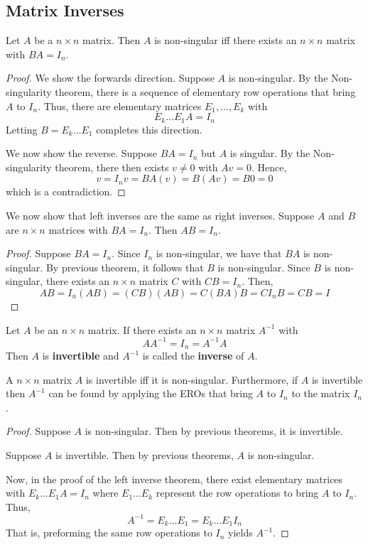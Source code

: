 \documentclass{article}
\begin{document}
\subsection{Matrix Inverses}
\begin{theorem}
  Let $A$ be a $n\times n$ matrix. Then $A$ is non-singular iff there exists an $n \times n$ matrix with $BA = I_n$.
\end{theorem}
\begin{proof}
  We show the forwards direction. Suppose $A$ is non-singular. By the Non-singularity theorem, there is a sequence of elementary row operations that bring $A$ to $I_n$. Thus, there are elementary matrices $E_1, \ldots, E_k$ with
  \[
    E_k\dots E_1A = I_n
  \]
  Letting $B = E_k\dots E_1$ completes this direction.

  We now show the reverse.
  Suppose $BA = I_n$ but $A$ is singular. By the Non-singularity theorem, there then exists $v \not = 0$ with $Av = 0$. Hence,
  \[
    v = I_nv = BA(v) = B(Av) = B0 = 0
  \]
  which is a contradiction.
\end{proof}
\begin{theorem}
  We now show that left inverses are the same as right inverses.
  Suppose $A$ and $B$ are $n \times n$ matrices with $BA = I_n$. Then $AB = I_n$.
\end{theorem}
\begin{proof}
  Suppose $BA = I_n$. Since $I_n$ is non-singular, we have that $BA$ is non-singular. By previous theorem, it follows that $B$ is non-singular. Since $B$ is non-singular, there exists an $n \times n$ matrix $C$ with $CB = I_n$. Then,
  \[
    AB = I_n(AB) = (CB)(AB) = C(BA)B = CI_nB = CB = I
  \]
\end{proof}
\begin{definition}
  Let $A$ be an $n \times n$ matrix. If there exists an $n \times n$ matrix $A^{-1}$ with \[
    AA^{-1} = I_n = A^{-1}A
  \]
  Then $A$ is \textbf{invertible} and $A^{-1}$ is called the \textbf{inverse} of $A$.
\end{definition}
\begin{theorem}
  A $n \times n$ matrix $A$ is invertible iff it is non-singular. Furthermore, if $A$ is invertible then $A^{-1}$ can be found by applying the EROs that bring $A$ to $I_n$ to the matrix $I_n$.
\end{theorem}
\begin{proof}
  Suppose $A$ is non-singular. Then by previous theorems, it is invertible.

  Suppose $A$ is invertible. Then by previous theorems, $A$ is non-singular.

  Now, in the proof of the left inverse theorem, there exist elementary matrices with $E_k\dots E_1A = I_n$
  where $E_1 \dots E_k$ represent the row operations to bring $A$ to $I_n$. Thus, \[
    A^{-1} = E_k\dots E_1 = E_k\dots E_1 I_n
  \]
  That is, preforming the same row operations to $I_n$ yields $A^{-1}$.
\end{proof}
\end{document}
